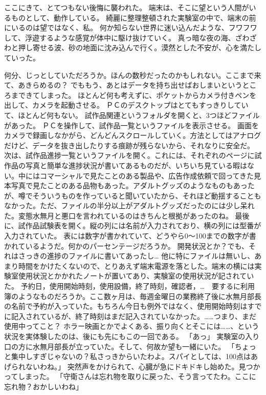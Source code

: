 ここにきて、とてつもない後悔に襲われた。
端末は、そこに望という人間がいるものとして、動作している。
綺麗に整理整頓された実験室の中で、端末の前にいるのは望ではなく、私。
何か知らない世界に迷い込んだような、フワフワして、浮遊するような感覚が体中に駆け抜けていく。
真っ暗な夜の海、ざわざわと押し寄せる波、砂の地面に沈み込んで行く。漠然とした不安が、心を満たしていった。

何分、じっとしていただろうか。ほんの数秒だったのかもしれない。ここまで来て、あきらめるの？
でももう、あとはデータを持ち出せばおしまいというところまできてしまった。
ほとんど何も考えずに、ポケットからカメラ付きペンを出して、カメラを起動させる。
ＰＣのデスクトップはとてもすっきりしていて、ほとんど何もない。
試作品関連というフォルダを開くと、3つほどファイルがあった。
ＰＣを操作して、試作品一覧というファイルを表示させる。
画面をカメラで録画しなかがら、どんどんスクロールしていく。方法としてはアナログだけど、データを抜き出したりする痕跡が残らないから、それなりに安全だ。
次は、試作品進捗一覧というファイルを開く。これには、それぞれのページに試作品の写真と簡単な進捗状況が書いてあるものだが、いちいち見ている暇はない。中にはコマーシャルで見たことのある製品や、広告作成依頼で回ってきた見本写真で見たことのある品物もあった。アダルトグッズのようなものもあったが、噂でそういうものを作っていると聞いていたから、それほど動揺することもなかった。ただ、ファイルの半分以上がアダルトグッズだったのには少し呆れた。変態水無月と悪口を言われているのはきちんと根拠があったのね。
最後に、試作品試験表を開く。縦の列には名前が入力されており、横の列には型番が入力されていた。
表には数字が書かれていて、どうやら0～100までの数字が書かれているようだ。何かのパーセンテージだろうか。
開発状況とか？でも、それはさっきの進捗のファイルに書いてあったし…
他に特にファイルは無いし、あまり時間をかけたくないので、とりあえず端末電源を落とした。端末の横には実験室使用状況とかかれたノートが置いてあり、実験室の使用状況が記されていた。
予約日，使用開始時刻，使用設備，終了時刻，確認者，…　要するに利用簿のようなものだろうか。ここ数ヶ月は、毎週金曜日の業務終了後に水無月部長の名前で予約が入っていた。もちろん今日も例外ではなく、使用開始時刻はすでに記入されているが、終了時刻はまだ記入されていなかった。……つまり、まだ使用中ってこと？
ホラー映画とかでよくある、振り向くとそこには……、という状況を実体験したのは、後にも先にもこの一回である。
「あっ」
実験室の入り口の方に水無月部長が立っていた。そして、何故か望も一緒にいた。
「ちょっと集中しすぎじゃないの？私さっきからいたわよ。スパイとしては、100点はあげられないわね。」
突然声をかけられて、心臓が急にドキドキし始めた。見つかってしまった。
「守衛さんは忘れ物を取りに戻った、そう言ってたわ。ここに忘れ物？おかしいわね」
